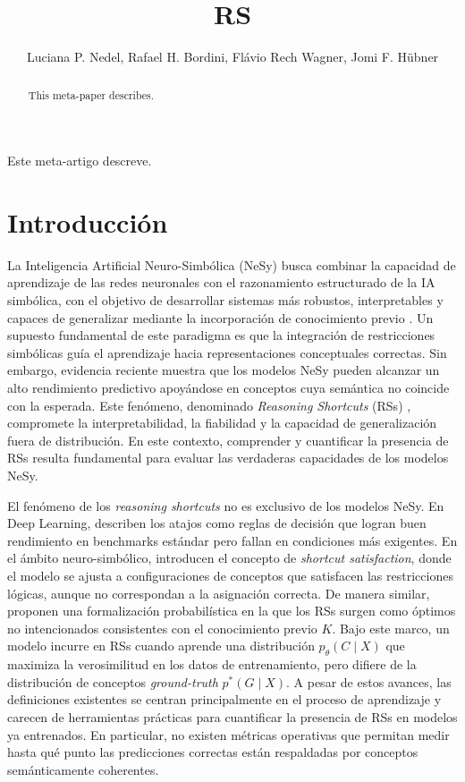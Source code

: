 \documentclass[12pt]{article}
\title{RS}
\author{Luciana P. Nedel\inst{1}, Rafael H. Bordini\inst{2}, Flávio Rech
  Wagner\inst{1}, Jomi F. Hübner\inst{3} }
\begin{document}
 

\maketitle

\begin{abstract}
  This meta-paper describes.
\end{abstract}
     
\begin{resumo} 
  Este meta-artigo descreve.
\end{resumo}


\section{Introducción} \label{sec:intro}

La Inteligencia Artificial Neuro-Simbólica (NeSy) busca combinar la capacidad de aprendizaje de las redes neuronales con el razonamiento estructurado de la IA simbólica, con el objetivo de desarrollar sistemas más robustos, interpretables y capaces de generalizar mediante la incorporación de conocimiento previo \cite{Colelough2024, Yang2025, Acharya2025}. Un supuesto fundamental de este paradigma es que la integración de restricciones simbólicas guía el aprendizaje hacia representaciones conceptuales correctas. Sin embargo, evidencia reciente \cite{Marconato2023-NotAll, Yang2024} muestra que los modelos NeSy pueden alcanzar un alto rendimiento predictivo apoyándose en conceptos cuya semántica no coincide con la esperada. Este fenómeno, denominado \textit{Reasoning Shortcuts} (RSs) \cite{Marconato2023-NotAll}, compromete la interpretabilidad, la fiabilidad y la capacidad de generalización fuera de distribución. En este contexto, comprender y cuantificar la presencia de RSs resulta fundamental para evaluar las verdaderas capacidades de los modelos NeSy.

El fenómeno de los \textit{reasoning shortcuts} no es exclusivo de los modelos NeSy. En Deep Learning, \cite{Geirhos2020} describen los atajos como reglas de decisión que logran buen rendimiento en benchmarks estándar pero fallan en condiciones más exigentes. En el ámbito neuro-simbólico, \cite{Li2024} introducen el concepto de \textit{shortcut satisfaction}, donde el modelo se ajusta a configuraciones de conceptos que satisfacen las restricciones lógicas, aunque no correspondan a la asignación correcta. De manera similar, \cite{Marconato2023-NotAll} proponen una formalización probabilística en la que los RSs surgen como óptimos no intencionados consistentes con el conocimiento previo $K$. Bajo este marco, un modelo incurre en RSs cuando aprende una distribución $p_\theta(C \mid X)$ que maximiza la verosimilitud en los datos de entrenamiento, pero difiere de la distribución de conceptos \textit{ground-truth} $p^*(G \mid X)$. A pesar de estos avances, las definiciones existentes se centran principalmente en el proceso de aprendizaje y carecen de herramientas prácticas para cuantificar la presencia de RSs en modelos ya entrenados. En particular, no existen métricas operativas que permitan medir hasta qué punto las predicciones correctas están respaldadas por conceptos semánticamente coherentes.
\end{document}
